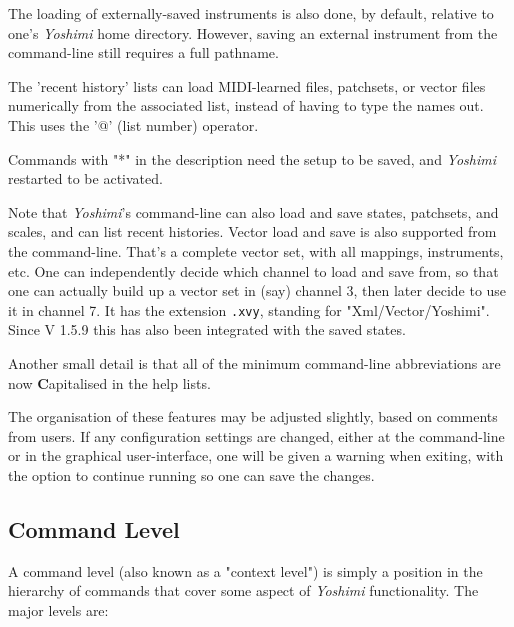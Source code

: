    The loading of externally-saved instruments is also done, by default,
   relative to one's \textsl{Yoshimi} home directory.  However, saving an
   external instrument from the command-line still requires a full pathname.

   The 'recent history' lists can load MIDI-learned files, patchsets, or
   vector files numerically from the associated list,
   instead of having to type the names out.
   This uses the '@' (list number) operator.

   Commands with "*" in the description need the setup to be saved,
   and \textsl{Yoshimi} restarted to be activated.

   Note that \textsl{Yoshimi}'s command-line can also load and save states,
   patchsets, and scales, and can list recent histories.
   Vector load and save is also supported from the command-line.
   That's a complete vector set, with all mappings, instruments, etc.
   One can independently decide which
   channel to load and save from, so that one
   can actually build up a vector set in
   (say) channel 3, then later decide to use it in channel 7.
   It has the extension \texttt{.xvy}, standing for "Xml/Vector/Yoshimi".
   Since V 1.5.9 this has also been integrated with the saved states.

   Another small detail is that all of the minimum command-line
   abbreviations are now \textbf{C}apitalised in the help lists.

   The organisation of these features may be adjusted slightly, based on
   comments from users.  If any configuration settings are changed, either
   at the command-line or in the graphical user-interface, one will be given
   a warning when exiting, with the option to continue running so one can
   save the changes.

\subsection{Command Level}
\label{subsec:command_line_command_level}

   A command level (also known as a "context level")
   is simply a position in the hierarchy of commands that cover
   some aspect of \textsl{Yoshimi} functionality.
   The major levels are:

